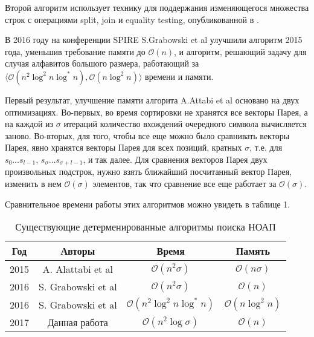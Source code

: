 Второй алгоритм использует технику для поддержания изменяющегося множества строк с операциями split, join и equality testing, опубликованной в \cite{9}.


В 2016 году на конференции SPIRE S.Grabowski et al \cite{4} улучшили алгоритм 2015 года, уменьшив требование памяти до $\mathcal{O}(n)$, и алгоритм, решающий задачу для случая алфавитов большого размера, работающий за $\langle \mathcal{O}(n^2 \log^2 n \log^* n), \mathcal{O}(n \log^2 n) \rangle$ времени и памяти. 

Первый результат, улучшение памяти алгорита A.Attabi et al основано на двух оптимизациях. Во-первых, во время сортировки не хранятся все векторы Парея, а на каждой из $\sigma$ итераций количество вхождений очередного символа вычисляется заново. Во-вторых, для того, чтобы все еще можно было сравнивать векторы Парея, явно хранятся векторы Парея для всех позиций, кратных $\sigma$, т.е. для $s_0 \ldots s_{l-1}$, $s_\sigma \ldots s_{\sigma + l - 1}$, и так далее. Для сравнения векторов Парея двух произвольных подстрок, нужно взять ближайший посчитанный вектор Парея, изменить в нем $\mathcal{O}(\sigma)$ элементов, так что сравнение все еще работает за $\mathcal{O}(\sigma)$.


Сравнительное времени работы этих алгоритмов можно увидеть в таблице 1.

\begin{table}[H]
\begin{center}
\begin{tabular}{|c|c|c|c|}
\hline
Год & Авторы & Время & Память \\
\hline
2015 & A. Alattabi et al & $\mathcal{O}(n^2 \sigma)$ & $\mathcal{O}(n \sigma)$ \\
\hline
2016 & S. Grabowski et al & $\mathcal{O}(n^2 \sigma)$ & $\mathcal{O}(n)$ \\
\hline
2016 & S. Grabowski et al & $\mathcal{O}(n^2 \log^2 n \log^* n)$ & $\mathcal{O}(n \log^2 n)$ \\
\hline
2017 & Данная работа & $\mathcal{O}(n^2 \log \sigma)$ & $\mathcal{O}(n)$ \\
\hline
\end{tabular}
\end{center}
\caption{Существующие детерменированные алгоритмы поиска НОАП}
\end{table}

